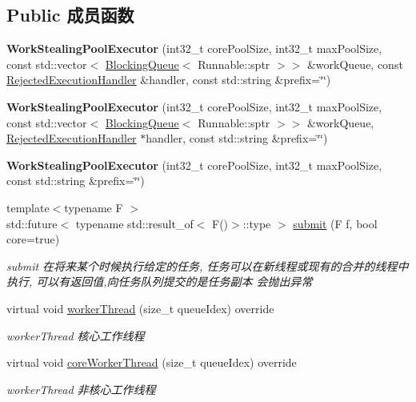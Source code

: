 \subsection*{Public 成员函数}
\begin{DoxyCompactItemize}
\item 
\mbox{\label{classWorkStealingPoolExecutor_a6f3b6c9f2b85bf2d16f47adc11373bd0}} 
{\bfseries Work\+Stealing\+Pool\+Executor} (int32\+\_\+t core\+Pool\+Size, int32\+\_\+t max\+Pool\+Size, const std\+::vector$<$ \hyperlink{classBlockingQueue}{Blocking\+Queue}$<$ Runnable\+::sptr $>$$>$ \&work\+Queue, const \hyperlink{classRejectedExecutionHandler}{Rejected\+Execution\+Handler} \&handler, const std\+::string \&prefix=\char`\"{}\char`\"{})
\item 
\mbox{\label{classWorkStealingPoolExecutor_af5a4263bc3a71629a9f87a950c64badb}} 
{\bfseries Work\+Stealing\+Pool\+Executor} (int32\+\_\+t core\+Pool\+Size, int32\+\_\+t max\+Pool\+Size, const std\+::vector$<$ \hyperlink{classBlockingQueue}{Blocking\+Queue}$<$ Runnable\+::sptr $>$$>$ \&work\+Queue, \hyperlink{classRejectedExecutionHandler}{Rejected\+Execution\+Handler} $\ast$handler, const std\+::string \&prefix=\char`\"{}\char`\"{})
\item 
\mbox{\label{classWorkStealingPoolExecutor_a0c1afe0d9ef06205dd01d5ced97c8981}} 
{\bfseries Work\+Stealing\+Pool\+Executor} (int32\+\_\+t core\+Pool\+Size, int32\+\_\+t max\+Pool\+Size, const std\+::string \&prefix=\char`\"{}\char`\"{})
\item 
{\footnotesize template$<$typename F $>$ }\\std\+::future$<$ typename std\+::result\+\_\+of$<$ F()$>$\+::type $>$ \hyperlink{classWorkStealingPoolExecutor_a84571339d5bafe81925c10d27f020ab4}{submit} (F f, bool core=true)
\begin{DoxyCompactList}\small\item\em submit 在将来某个时候执行给定的任务, 任务可以在新线程或现有的合并的线程中执行, 可以有返回值,向任务队列提交的是任务副本 会抛出异常 \end{DoxyCompactList}\item 
virtual void \hyperlink{classWorkStealingPoolExecutor_ad00399d153ba5d77704dae2c1816b566}{worker\+Thread} (size\+\_\+t queue\+Idex) override
\begin{DoxyCompactList}\small\item\em worker\+Thread 核心工作线程 \end{DoxyCompactList}\item 
virtual void \hyperlink{classWorkStealingPoolExecutor_ae0445ee114ceec03cf9513c394df7c89}{core\+Worker\+Thread} (size\+\_\+t queue\+Idex) override
\begin{DoxyCompactList}\small\item\em worker\+Thread 非核心工作线程 \end{DoxyCompactList}\end{DoxyCompactItemize}
